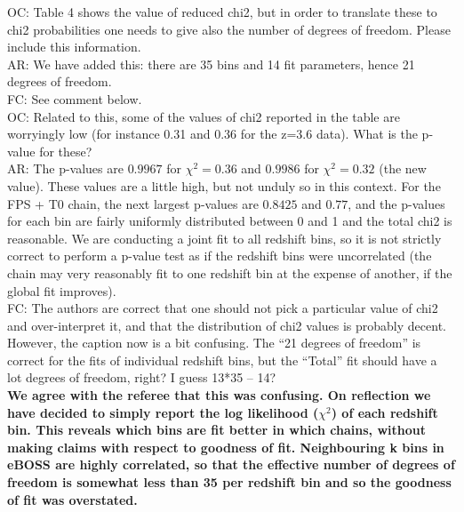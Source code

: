 \documentclass[12pt]{article}
\begin{document}
OC: Table 4 shows the value of reduced chi2, but in order to translate these to chi2 probabilities one needs to give also the number of degrees of freedom. Please include this information.\\

AR: We have added this: there are 35 bins and 14 fit parameters, hence 21 degrees of freedom.\\

FC: See comment below.\\


OC: Related to this, some of the values of chi2 reported in the table are worryingly low (for instance 0.31 and 0.36 for the z=3.6 data). What is the p-value for these?\\

AR: The p-values are $0.9967$ for $\chi^2 = 0.36$ and $0.9986$ for $\chi^2 = 0.32$ (the new value). These values are a little high, but not unduly so in this context. For the FPS + T0 chain, the next largest p-values are $0.8425$ and $0.77$, and the p-values for each bin are fairly uniformly distributed between 0 and 1 and the total chi2 is reasonable. We are conducting a joint fit to all redshift bins, so it is not strictly correct to perform a p-value test as if the redshift bins were uncorrelated (the chain may very reasonably fit to one redshift bin at the expense of another, if the global fit improves).\\

FC: The authors are correct that one should not pick a particular value of chi2 and over-interpret it, and that the distribution of chi2 values is probably decent. However, the caption now is a bit confusing. The “21 degrees of freedom” is correct for the fits of individual redshift bins, but the “Total” fit should have a lot degrees of freedom, right? I guess 13*35 – 14?\\

\textbf{We agree with the referee that this was confusing. On reflection we have decided to simply report the log likelihood ($\chi^2$) of each redshift bin. This reveals which bins are fit better in which chains, without making claims with respect to goodness of fit. Neighbouring k bins in eBOSS are highly correlated, so that the effective number of degrees of freedom is somewhat less than 35 per redshift bin and so the goodness of fit was overstated.}\\
\end{document}
